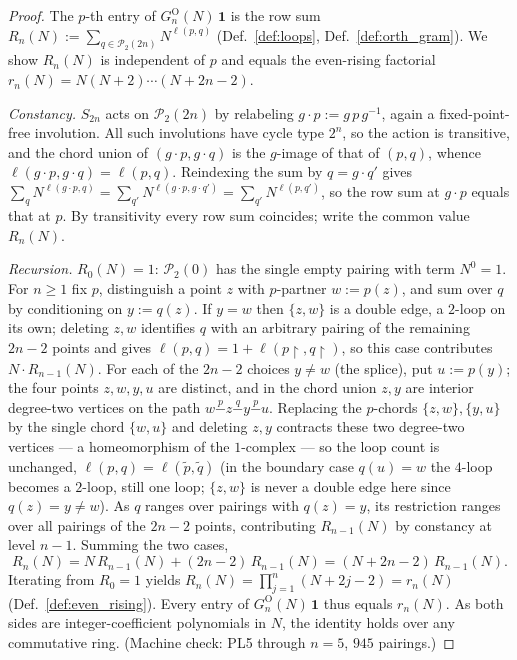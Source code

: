 \begin{proof}\leanok
{}
The $p$-th entry of $G^{\mathrm O}_n(N)\,\mathbf 1$ is the row sum
$R_n(N):=\sum_{q\in\mathcal P_2(2n)}N^{\ell(p,q)}$ (Def.~\ref{def:loops},
Def.~\ref{def:orth_gram}). We show $R_n(N)$ is independent of $p$ and equals
the even-rising factorial $r_n(N)=N(N+2)\cdots(N+2n-2)$.

\emph{Constancy.} $S_{2n}$ acts on $\mathcal P_2(2n)$ by relabeling
$g\cdot p:=g\,p\,g^{-1}$, again a fixed-point-free involution. All such
involutions have cycle type $2^n$, so the action is transitive, and the
chord union of $(g\cdot p,g\cdot q)$ is the $g$-image of that of $(p,q)$,
whence $\ell(g\cdot p,g\cdot q)=\ell(p,q)$. Reindexing the sum by
$q=g\cdot q'$ gives
$\sum_q N^{\ell(g\cdot p,q)}=\sum_{q'}N^{\ell(g\cdot p,g\cdot q')}
=\sum_{q'}N^{\ell(p,q')}$, so the row sum at $g\cdot p$ equals that at $p$.
By transitivity every row sum coincides; write the common value $R_n(N)$.

\emph{Recursion.} $R_0(N)=1$: $\mathcal P_2(0)$ has the single empty
pairing with term $N^0=1$. For $n\ge1$ fix $p$, distinguish a point $z$ with
$p$-partner $w:=p(z)$, and sum over $q$ by conditioning on $y:=q(z)$.
If $y=w$ then $\{z,w\}$ is a double edge, a $2$-loop on its own;
deleting $z,w$ identifies $q$ with an arbitrary pairing of the remaining
$2n-2$ points and gives $\ell(p,q)=1+\ell(p\!\restriction,q\!\restriction)$,
so this case contributes $N\cdot R_{n-1}(N)$. For each of the $2n-2$ choices
$y\ne w$ (the splice), put $u:=p(y)$; the four points $z,w,y,u$ are
distinct, and in the chord union $z,y$ are interior degree-two vertices on
the path $w\overset{p}{-}z\overset{q}{-}y\overset{p}{-}u$. Replacing the
$p$-chords $\{z,w\},\{y,u\}$ by the single chord $\{w,u\}$ and deleting
$z,y$ contracts these two degree-two vertices --- a homeomorphism of the
$1$-complex --- so the loop count is unchanged,
$\ell(p,q)=\ell(\tilde p,\tilde q)$ (in the boundary case $q(u)=w$ the
$4$-loop becomes a $2$-loop, still one loop; $\{z,w\}$ is never a double
edge here since $q(z)=y\ne w$). As $q$ ranges over pairings with $q(z)=y$,
its restriction ranges over all pairings of the $2n-2$ points, contributing
$R_{n-1}(N)$ by constancy at level $n-1$. Summing the two cases,
\[
  R_n(N)=N\,R_{n-1}(N)+(2n-2)\,R_{n-1}(N)=(N+2n-2)\,R_{n-1}(N).
\]
Iterating from $R_0=1$ yields
$R_n(N)=\prod_{j=1}^n(N+2j-2)=r_n(N)$ (Def.~\ref{def:even_rising}). Every
entry of $G^{\mathrm O}_n(N)\,\mathbf 1$ thus equals $r_n(N)$. As both sides
are integer-coefficient polynomials in $N$, the identity holds over any
commutative ring. (Machine check: PL5 through $n=5$, $945$ pairings.)


\end{proof}
